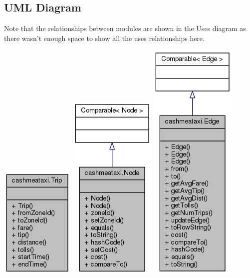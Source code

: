 \documentclass[12pt]{article}
\begin{document}
\newpage

\subsection{UML Diagram}
Note that the relationships between modules are shown in the Uses diagram as there wasn't enough space to show all the uses relationships here.

\begin{center}
\includegraphics[scale = 0.6]{uml/classcashmeataxi_1_1Trip__coll__graph.png}
\includegraphics[scale = 0.6]{uml/classcashmeataxi_1_1Node__coll__graph.png} 
\includegraphics[scale = 0.6]{uml/classcashmeataxi_1_1Edge__coll__graph.png} 

\end{center}
\end{document}
